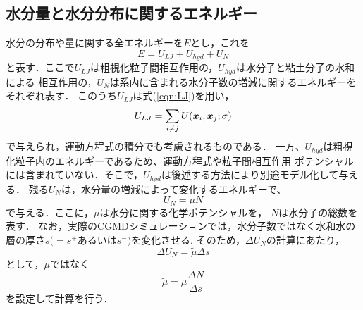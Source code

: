 \subsection{水分量と水分分布に関するエネルギー}
水分の分布や量に関する全エネルギーを$E$とし，これを
\begin{equation}
	E=U_{LJ} +U_{hyd} + U_N
	\label{eqn:}
\end{equation}
と表す．ここで$U_{LJ}$は粗視化粒子間相互作用の，$U_{hyd}$は水分子と粘土分子の水和による
相互作用の，$U_N$は系内に含まれる水分子数の増減に関するエネルギーをそれぞれ表す．
このうち$U_{LJ}$は式(\ref{eqn:LJ})を用い，
\begin{equation}
	U_{LJ}=\sum_{i\neq j} U(\mbox{\boldmath $x$}_i,\mbox{\boldmath $x$}_j;\sigma)
	\label{eqn:}
\end{equation}
で与えられ，運動方程式の積分でも考慮されるものである．
一方、$U_{hyd}$は粗視化粒子内のエネルギーであるため、運動方程式や粒子間相互作用
ポテンシャルには含まれていない．そこで，$U_{hyd}$は後述する方法により別途モデル化して与える．
残る$U_N$は，水分量の増減によって変化するエネルギーで、
\begin{equation}
	U_N=\mu N
	\label{eqn:U_N}
\end{equation}
で与える．ここに，$\mu$は水分に関する化学ポテンシャルを， $N$は水分子の総数を表す．
なお，実際のCGMDシミュレーションでは，水分子数ではなく水和水の層の厚さ$s(=s^{+}$あるいは$s^{-})$を変化させる. 
そのため，$\Delta U_N$の計算にあたり，
\begin{equation}
	\Delta U_N =\tilde \mu \Delta s
	\label{eqn:}
\end{equation}
として，$\mu$ではなく
\begin{equation}
	\tilde \mu =\mu \frac{\Delta N}{\Delta s}
	\label{eqn:}
\end{equation}
を設定して計算を行う．
